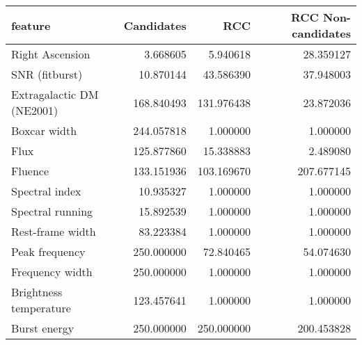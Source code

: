 \begin{tabular}{lrrr}
\toprule
feature & Candidates & RCC & RCC Non-candidates \\
\midrule
Right Ascension & 3.668605 & 5.940618 & 28.359127 \\
SNR (fitburst) & 10.870144 & 43.586390 & 37.948003 \\
Extragalactic DM (NE2001) & 168.840493 & 131.976438 & 23.872036 \\
Boxcar width & 244.057818 & 1.000000 & 1.000000 \\
Flux & 125.877860 & 15.338883 & 2.489080 \\
Fluence & 133.151936 & 103.169670 & 207.677145 \\
Spectral index & 10.935327 & 1.000000 & 1.000000 \\
Spectral running & 15.892539 & 1.000000 & 1.000000 \\
Rest-frame width & 83.223384 & 1.000000 & 1.000000 \\
Peak frequency & 250.000000 & 72.840465 & 54.074630 \\
Frequency width & 250.000000 & 1.000000 & 1.000000 \\
Brightness temperature & 123.457641 & 1.000000 & 1.000000 \\
Burst energy & 250.000000 & 250.000000 & 200.453828 \\
\bottomrule
\end{tabular}
